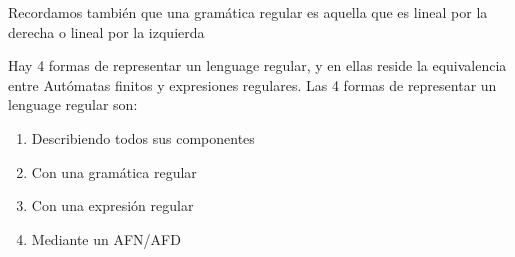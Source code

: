 \documentclass{apuntes}
\begin{document}
Recordamos también que una gramática regular es aquella que es lineal por la derecha o lineal por la izquierda
 
Hay 4 formas de representar un lenguage regular, y en ellas reside la equivalencia entre Autómatas finitos y expresiones regulares. Las 4 formas de representar un lenguage regular son:
\begin{enumerate}
\item Describiendo todos sus componentes
\item Con una gramática regular
\item Con una expresión regular
\item Mediante un AFN/AFD
\end{enumerate}
\end{document}
